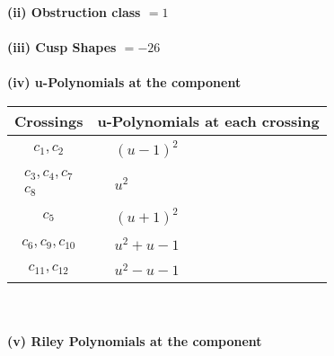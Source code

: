 \documentclass[1p]{elsarticle_modified}
\theoremstyle{definition}
\begin{document}
\flushleft \textbf{(ii) Obstruction class $= 1$}\\~\\
\flushleft \textbf{(iii) Cusp Shapes $= -26$}\\~\\
\newpage\renewcommand{\arraystretch}{1}
\flushleft \textbf{(iv) u-Polynomials at the component}\newline \\
\begin{tabular}{m{50pt}|m{274pt}}
Crossings & \hspace{64pt}u-Polynomials at each crossing \\
\hline $$\begin{aligned}c_{1},c_{2}\end{aligned}$$&$\begin{aligned}
&(u-1)^2
\end{aligned}$\\
\hline $$\begin{aligned}c_{3},c_{4},c_{7}\\c_{8}\end{aligned}$$&$\begin{aligned}
&u^2
\end{aligned}$\\
\hline $$\begin{aligned}c_{5}\end{aligned}$$&$\begin{aligned}
&(u+1)^2
\end{aligned}$\\
\hline $$\begin{aligned}c_{6},c_{9},c_{10}\end{aligned}$$&$\begin{aligned}
&u^2+u-1
\end{aligned}$\\
\hline $$\begin{aligned}c_{11},c_{12}\end{aligned}$$&$\begin{aligned}
&u^2- u-1
\end{aligned}$\\
\hline
\end{tabular}\\~\\
\newpage\renewcommand{\arraystretch}{1}
\flushleft \textbf{(v) Riley Polynomials at the component}\newline \\
\end{document}
